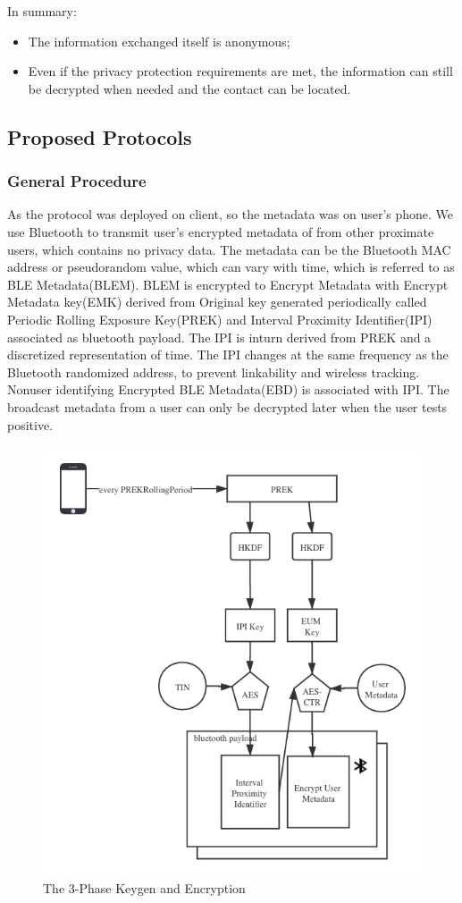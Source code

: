 \documentclass[11pt,en]{elegantpaper}
\begin{document}
In summary:
\begin{itemize}
	\item The information exchanged itself is anonymous;
	\item Even if the privacy protection requirements are met, the information can still be decrypted when needed and the contact can be located.
	
\end{itemize}

\subsection{Proposed Protocols}

\subsubsection{General Procedure}
As the protocol was deployed on client, so the metadata was on user's phone. We use Bluetooth to transmit user's encrypted metadata of from other proximate users, which contains no privacy data. The metadata can be the Bluetooth MAC address or pseudorandom value\cite{reichert2020privacy}, which can vary with time, which is referred to as BLE Metadata(BLEM). BLEM is encrypted to Encrypt Metadata with Encrypt Metadata key(EMK) derived from Original key generated periodically called Periodic Rolling Exposure Key(PREK) and Interval Proximity Identifier(IPI) associated as bluetooth payload. The IPI is inturn derived from PREK and a discretized representation of time. The IPI changes at the same frequency as the Bluetooth randomized address, to prevent linkability and wireless tracking. Nonuser identifying Encrypted BLE Metadata(EBD) is associated with IPI. The broadcast metadata from a user can only be decrypted later when the user tests positive\label{fig2}.

\begin{figure}[H]
	\centering
	\includegraphics[width=0.5\linewidth]{figure/tracking}
	\caption{The 3-Phase Keygen and Encryption}
	\label{fig:fig2}
\end{figure}
\end{document}
